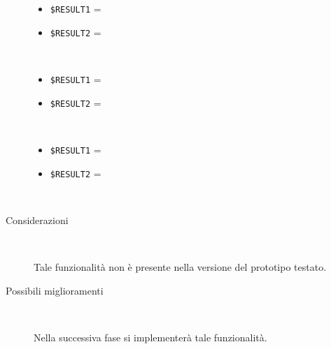 \documentclass[../../SperimentazioniPratiche.tex]{subfiles}
\begin{document}
\begin{tcolorbox}[fonttitle=\bfseries, 
								adjusted title={\Large Prova 12A.1}, 
								breakable, 
								sharp corners=south,
								colback=white, 
								colframe=white!60!black]
\begin{description}[leftmargin=0.7cm,labelwidth=!]
					\tcbline        				
        				
        			\item[Output riscontrato] \ \par
        				\begin{description}
        				
        					\item[\dispositivoA] \ \par
        					\begin{itemize}
        						\item \verb|$RESULT1| = \ok
        						\item \verb|$RESULT2| = \ok
        					\end{itemize}      					
        					
        					\item[\dispositivoB] \ \par
        					\begin{itemize}
        						\item \verb|$RESULT1| = \ok
        						\item \verb|$RESULT2| = \ok
        					\end{itemize}
        					
        					\item[\dispositivoC] \ \par
        					\begin{itemize}
        						\item \verb|$RESULT1| = \ok
        						\item \verb|$RESULT2| = \ok
        					\end{itemize}
        					
        				\end{description}
        				
        			\tcbline
        			
        			\item[Analisi risultati] \ \par
        				\begin{description}
        					\item[Considerazioni] \ \par
        						Tale funzionalità non è presente nella versione del prototipo testato.
        					
        					\item[Possibili miglioramenti] \ \par 
        						Nella successiva fase si implementerà tale funzionalità.
        				\end{description}
        				
				\end{description}  
				
			\end{tcolorbox}
\end{document}
